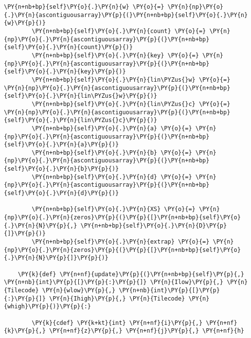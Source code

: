 \begin{Verbatim}[commandchars=\\\{\}]
        \PY{n+nb+bp}{self}\PY{o}{.}\PY{n}{w} \PY{o}{=} \PY{n}{np}\PY{o}{.}\PY{n}{ascontiguousarray}\PY{p}{(}\PY{n+nb+bp}{self}\PY{o}{.}\PY{n}{w}\PY{p}{)}
        \PY{n+nb+bp}{self}\PY{o}{.}\PY{n}{count} \PY{o}{=} \PY{n}{np}\PY{o}{.}\PY{n}{ascontiguousarray}\PY{p}{(}\PY{n+nb+bp}{self}\PY{o}{.}\PY{n}{count}\PY{p}{)}
        \PY{n+nb+bp}{self}\PY{o}{.}\PY{n}{key} \PY{o}{=} \PY{n}{np}\PY{o}{.}\PY{n}{ascontiguousarray}\PY{p}{(}\PY{n+nb+bp}{self}\PY{o}{.}\PY{n}{key}\PY{p}{)}
        \PY{n+nb+bp}{self}\PY{o}{.}\PY{n}{lin\PYZus{}w} \PY{o}{=} \PY{n}{np}\PY{o}{.}\PY{n}{ascontiguousarray}\PY{p}{(}\PY{n+nb+bp}{self}\PY{o}{.}\PY{n}{lin\PYZus{}w}\PY{p}{)}
        \PY{n+nb+bp}{self}\PY{o}{.}\PY{n}{lin\PYZus{}c} \PY{o}{=} \PY{n}{np}\PY{o}{.}\PY{n}{ascontiguousarray}\PY{p}{(}\PY{n+nb+bp}{self}\PY{o}{.}\PY{n}{lin\PYZus{}c}\PY{p}{)}
        \PY{n+nb+bp}{self}\PY{o}{.}\PY{n}{a} \PY{o}{=} \PY{n}{np}\PY{o}{.}\PY{n}{ascontiguousarray}\PY{p}{(}\PY{n+nb+bp}{self}\PY{o}{.}\PY{n}{a}\PY{p}{)}
        \PY{n+nb+bp}{self}\PY{o}{.}\PY{n}{b} \PY{o}{=} \PY{n}{np}\PY{o}{.}\PY{n}{ascontiguousarray}\PY{p}{(}\PY{n+nb+bp}{self}\PY{o}{.}\PY{n}{b}\PY{p}{)}
        \PY{n+nb+bp}{self}\PY{o}{.}\PY{n}{d} \PY{o}{=} \PY{n}{np}\PY{o}{.}\PY{n}{ascontiguousarray}\PY{p}{(}\PY{n+nb+bp}{self}\PY{o}{.}\PY{n}{d}\PY{p}{)}
    
        \PY{n+nb+bp}{self}\PY{o}{.}\PY{n}{XS} \PY{o}{=} \PY{n}{np}\PY{o}{.}\PY{n}{zeros}\PY{p}{(}\PY{p}{[}\PY{n+nb+bp}{self}\PY{o}{.}\PY{n}{N}\PY{p}{,} \PY{n+nb+bp}{self}\PY{o}{.}\PY{n}{D}\PY{p}{]}\PY{p}{)}
        \PY{n+nb+bp}{self}\PY{o}{.}\PY{n}{extrap} \PY{o}{=} \PY{n}{np}\PY{o}{.}\PY{n}{zeros}\PY{p}{(}\PY{p}{[}\PY{n+nb+bp}{self}\PY{o}{.}\PY{n}{N}\PY{p}{]}\PY{p}{)}

    \PY{k}{def} \PY{n+nf}{update}\PY{p}{(}\PY{n+nb+bp}{self}\PY{p}{,} \PY{n+nb}{int}\PY{p}{[}\PY{p}{:}\PY{p}{]} \PY{n}{Ilow}\PY{p}{,} \PY{n}{Tilecode} \PY{n}{wlow}\PY{p}{,} \PY{n+nb}{int}\PY{p}{[}\PY{p}{:}\PY{p}{]} \PY{n}{Ihigh}\PY{p}{,} \PY{n}{Tilecode} \PY{n}{whigh}\PY{p}{)}\PY{p}{:}

        \PY{k}{cdef} \PY{k+kt}{int} \PY{n+nf}{i}\PY{p}{,} \PY{n+nf}{k}\PY{p}{,} \PY{n+nf}{z}\PY{p}{,} \PY{n+nf}{j}\PY{p}{,} \PY{n+nf}{h}


\end{Verbatim}
